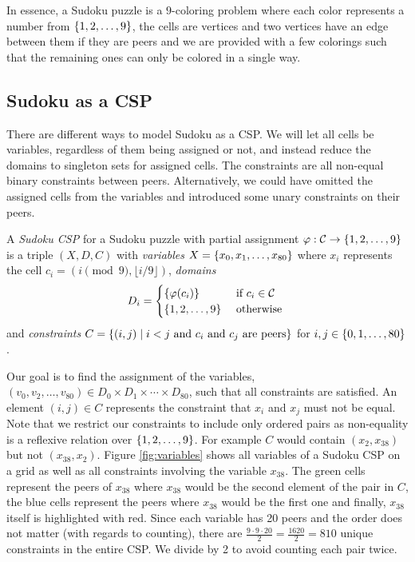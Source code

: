 In essence, a Sudoku puzzle is a $9$-coloring problem where each color represents a number from $\left\{1,2,\ldots,9\right\}$, the cells are vertices and two vertices have an edge between them if they are peers and we are provided with a few colorings such that the remaining ones can only be colored in a single way.


\subsection{Sudoku as a CSP}
There are different ways to model Sudoku as a CSP. We will let all cells be variables, regardless of them being assigned or not, and instead reduce the domains to singleton sets for assigned cells. The constraints are all non-equal binary constraints between peers. Alternatively, we could have omitted the assigned cells from the variables and introduced some unary constraints on their peers.
\begin{definition}
A \emph{Sudoku CSP} for a Sudoku puzzle with partial assignment $\varphi: \mathcal{C} \to \left\{1,2,\ldots,9\right\}$ is a triple $(X,D,C)$ with \emph{variables} $X=\left\{x_0,x_1,\ldots,x_{80}\right\}$ where $x_i$ represents the cell $c_i = \left(i \pmod 9, \lfloor i/9  \rfloor\right)$, \emph{domains}
\[
    D_i = \begin{cases}\left\{\varphi(c_i)\right\} & \mbox{ if $c_i \in \mathcal{C}$}\\\left\{1,2,\ldots,9\right\} & \mbox{ otherwise }\end{cases}
\]
and \emph{constraints} $C = \left\{(i,j) \mid i < j \text{ and } c_i \text{ and } c_j \text{ are peers}\right\}$  for $i,j\in\left\{0,1,\ldots,80\right\}$.
\end{definition}

Our goal is to find the assignment of the variables, $(v_0,v_2,\ldots,v_{80}) \in D_0 \times D_1 \times \cdots \times D_{80}$, such that all constraints are satisfied. An element $(i,j)\in C$ represents the constraint that $x_i$ and $x_j$ must not be equal. Note that we restrict our constraints to include only ordered pairs as non-equality is a reflexive relation over $\left\{1,2,\ldots,9\right\}$. For example $C$ would contain $(x_2,x_{38})$ but not $(x_{38},x_2)$. Figure \ref{fig:variables} shows all variables of a Sudoku CSP on a grid as well as all constraints involving the variable $x_{38}$. The green cells represent the peers of $x_{38}$ where $x_{38}$ would be the second element of the pair in $C$, the blue cells represent the peers where $x_{38}$ would be the first one and finally, $x_{38}$ itself is highlighted with red. Since each variable has 20 peers and the order does not matter (with regards to counting), there are $\frac{9\cdot9\cdot20}{2} = \frac{1620}{2} = 810$ unique constraints in the entire CSP. We divide by 2 to avoid counting each pair twice.

